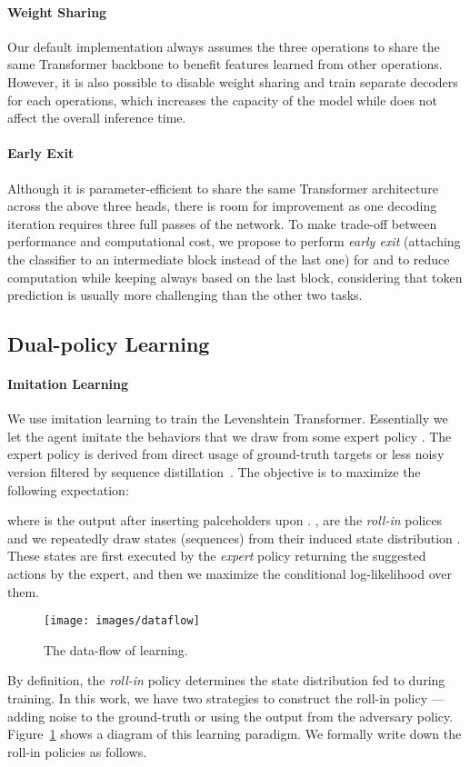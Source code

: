 \documentclass{article}
\begin{document}
\paragraph{Weight Sharing} Our default implementation always assumes the three operations to share the same Transformer backbone to benefit features learned from other operations. However, it is also possible to disable weight sharing and train separate decoders for each operations, which increases the capacity of the model while does not affect the overall inference time.
\paragraph{Early Exit} Although it is parameter-efficient to share the same Transformer architecture across the above three heads, there is room for improvement as one decoding iteration requires three full passes of the network. To make trade-off between performance and computational cost, we propose to perform \textit{early exit} (attaching the classifier to an intermediate block instead of the last one) for  and  to reduce computation while keeping  always based on the last block, considering that token prediction is usually more challenging than the other two tasks.

\subsection{Dual-policy Learning}
\label{sec.learning}
\paragraph{Imitation Learning} 
We use imitation learning to train the Levenshtein Transformer. Essentially we let the agent imitate the behaviors that we draw from some expert policy . The expert policy is derived from direct usage of ground-truth targets or less noisy version filtered by sequence distillation~\citep{kim2016sequence}. The objective is to maximize the following expectation:

where  is the output after inserting palceholders  upon  .
,  are the \textit{roll-in} polices and we repeatedly draw states (sequences) from their induced state distribution . These states are first executed by the \textit{expert} policy returning the suggested actions by the expert, and then we maximize the conditional log-likelihood over them.
\begin{figure}[htpb]\centering
    \texttt{[image: images/dataflow]}
    \caption{\label{fig.dataflow}The data-flow of learning.}
\end{figure}
By definition, the \textit{roll-in} policy determines the state distribution fed to  during training.
In this work, we have two strategies to construct the roll-in policy --- adding noise to the ground-truth or using the output from the adversary policy. Figure~\ref{fig.dataflow} shows a diagram of this learning paradigm.
We formally write down the roll-in policies as follows.
\end{document}
